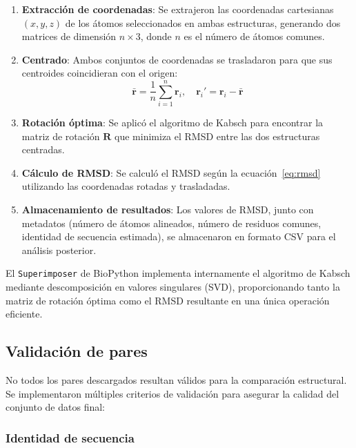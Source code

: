 \begin{enumerate}
    \item \textbf{Extracci\'on de coordenadas}: Se extrajeron las coordenadas cartesianas $(x, y, z)$ de los \'atomos seleccionados en ambas estructuras, generando dos matrices de dimensi\'on $n \times 3$, donde $n$ es el n\'umero de \'atomos comunes.

    \item \textbf{Centrado}: Ambos conjuntos de coordenadas se trasladaron para que sus centroides coincidieran con el origen:
    \begin{equation}
        \bar{\mathbf{r}} = \frac{1}{n} \sum_{i=1}^{n} \mathbf{r}_i, \quad \mathbf{r}_i' = \mathbf{r}_i - \bar{\mathbf{r}}
        \label{eq:centrado}
    \end{equation}

    \item \textbf{Rotaci\'on \'optima}: Se aplic\'o el algoritmo de Kabsch para encontrar la matriz de rotaci\'on $\mathbf{R}$ que minimiza el RMSD entre las dos estructuras centradas.

    \item \textbf{C\'alculo de RMSD}: Se calcul\'o el RMSD seg\'un la ecuaci\'on~\ref{eq:rmsd} utilizando las coordenadas rotadas y trasladadas.

    \item \textbf{Almacenamiento de resultados}: Los valores de RMSD, junto con metadatos (n\'umero de \'atomos alineados, n\'umero de residuos comunes, identidad de secuencia estimada), se almacenaron en formato CSV para el an\'alisis posterior.
\end{enumerate}

El \texttt{Superimposer} de BioPython implementa internamente el algoritmo de Kabsch mediante descomposici\'on en valores singulares (SVD), proporcionando tanto la matriz de rotaci\'on \'optima como el RMSD resultante en una \'unica operaci\'on eficiente.

\subsection{Validaci\'on de pares}
\label{subsec:validacion_pares}

No todos los pares descargados resultan v\'alidos para la comparaci\'on estructural. Se implementaron m\'ultiples criterios de validaci\'on para asegurar la calidad del conjunto de datos final:

\subsubsection{Identidad de secuencia}


